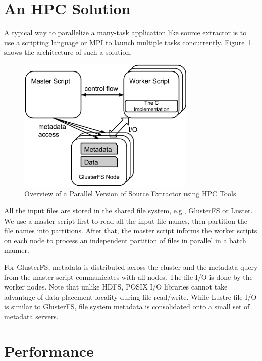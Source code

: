 \documentclass[10pt,journal,compsoc]{IEEEtran}
\begin{document}
\section{An HPC Solution}
\label{sec:HPC}
A typical way to parallelize a many-task application like source extractor is to use a scripting language
or MPI to launch multiple tasks concurrently. Figure~\ref{fig:hpc-architecture} shows the architecture
of such a solution.

\begin{figure}[t]
	\begin{center}
		\includegraphics[width=85mm]{pictures/HPC-Architecture}
		\caption{Overview of a Parallel Version of Source Extractor using HPC Tools}
		\label{fig:hpc-architecture}
  	\end{center}
\end{figure}

All the input files are stored in the shared file system, e.g., GlusterFS or Luster. We use a master script
first to read all the input file names, then partition the file names into partitions. After that, the master
script informs the worker scripts on each node to process an independent partition of files in parallel 
in a batch manner.

For GlusterFS, metadata is distributed across the cluster and the metadata query from the master script
communicates with all nodes. The file I/O is done by the worker nodes. Note that unlike HDFS, 
POSIX I/O libraries cannot take advantage of data placement locality during file read/write. While Lustre 
file I/O is similar to GlusterFS, file system metadata is consolidated onto a small set of metadata servers.

\section{Performance}
\label{sec:Performance}
\end{document}

